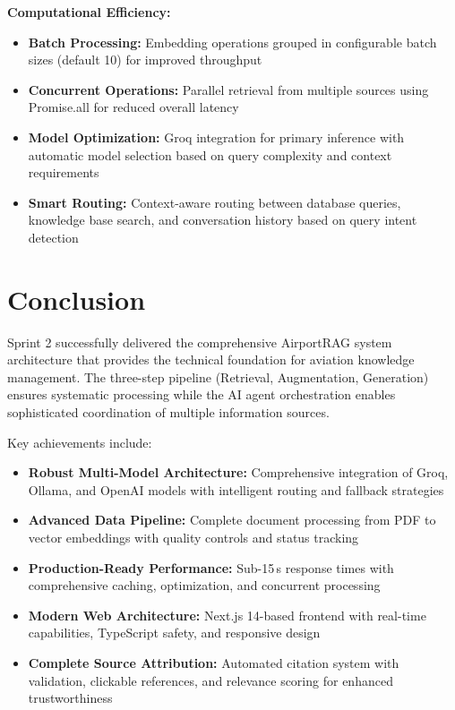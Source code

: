 \textbf{Computational Efficiency:}
\begin{itemize}
    \item \textbf{Batch Processing:} Embedding operations grouped in configurable batch sizes (default 10) for improved throughput
    \item \textbf{Concurrent Operations:} Parallel retrieval from multiple sources using Promise.all for reduced overall latency
    \item \textbf{Model Optimization:} Groq integration for primary inference with automatic model selection based on query complexity and context requirements
    \item \textbf{Smart Routing:} Context-aware routing between database queries, knowledge base search, and conversation history based on query intent detection
\end{itemize}

\section{Conclusion}
\label{sec:conclusion_s2}

Sprint 2 successfully delivered the comprehensive AirportRAG system architecture that provides the technical foundation for aviation knowledge management. The three-step pipeline (Retrieval, Augmentation, Generation) ensures systematic processing while the AI agent orchestration enables sophisticated coordination of multiple information sources.

Key achievements include:
\begin{itemize}
    \item \textbf{Robust Multi-Model Architecture:} Comprehensive integration of Groq, Ollama, and OpenAI models with intelligent routing and fallback strategies
    \item \textbf{Advanced Data Pipeline:} Complete document processing from PDF to vector embeddings with quality controls and status tracking
    \item \textbf{Production-Ready Performance:} Sub-15\,s response times with comprehensive caching, optimization, and concurrent processing
    \item \textbf{Modern Web Architecture:} Next.js 14-based frontend with real-time capabilities, TypeScript safety, and responsive design
    \item \textbf{Complete Source Attribution:} Automated citation system with validation, clickable references, and relevance scoring for enhanced trustworthiness
\end{itemize}

